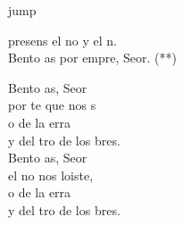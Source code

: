 \begin{cancion}jump\\
	\begin{chorus}%
		 presens el no y el n.\\
		Bento as por empre, Seor. (**)\jump\\
	\end{chorus}%
	Bento as, Seor\\
	por te  que nos s\\
	o de la erra\\
	y del tro de los bres.\\
	\jump
	Bento as, Seor\\
	el no  nos loiste,\\
	o de la erra\\
	y del tro de los bres.\\
\end{cancion}%
